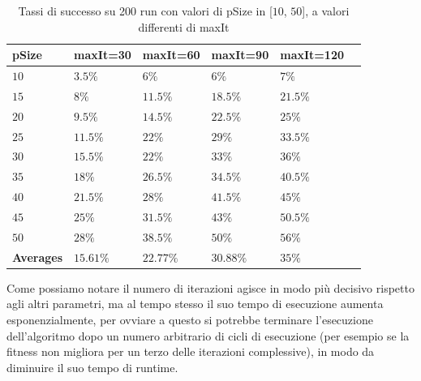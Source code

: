 \begin{center}
\begin{table}[H]
    \centering
    \begin{tabular}{|C{2.18cm}C{2.18cm}C{2.18cm}C{2.18cm}C{2.18cm}C{2.18cm}|}
        \hline
        \textbf{pSize} & \textbf{maxIt=30} & \textbf{maxIt=60} & \textbf{maxIt=90} & \textbf{maxIt=120} \\ \hline
        
         $10$ &  $3.5\%$ &  $6\%$ &  $6\%$ &  $7\%$ \\
            
        $15$ & $8\%$ & $11.5\%$ & $18.5\%$ & $21.5\%$ \\
            
         $20$ &  $9.5\%$ &  $14.5\%$ &  $22.5\%$ &  $25\%$ \\
            
        $25$ & $11.5\%$ & $22\%$ & $29\%$ & $33.5\%$ \\
            
         $30$ &  $15.5\%$ &  $22\%$ &  $33\%$ &  $36\%$ \\
            
        $35$ & $18\%$ & $26.5\%$ & $34.5\%$ & $40.5\%$ \\
            
         $40$ &  $21.5\%$ &  $28\%$ &  $41.5\%$ &  $45\%$ \\
            
        $45$ & $25\%$ & $31.5\%$ & $43\%$ & $50.5\%$ \\
            
         $50$ &  $28\%$ &  $38.5\%$ &  $50\%$ &  $56\%$ \\
            
        \hline
        
        \textbf{Averages} & $15.61\%$ & $22.77\%$ & $30.88\%$ & $35\%$ \\
        
        \hline
    \end{tabular}
    \caption{Tassi di successo su 200 run con valori di pSize in [$10$, $50$], a valori differenti di maxIt}
    \label{tab:table4}
\end{table}
\end{center}
Come possiamo notare il numero di iterazioni agisce in modo pi\`u decisivo rispetto agli altri parametri, ma al tempo stesso il suo tempo di esecuzione aumenta esponenzialmente, per ovviare a questo si potrebbe terminare l'esecuzione dell'algoritmo dopo un numero arbitrario di cicli di esecuzione (per esempio se la fitness non migliora per un terzo delle iterazioni complessive), in modo da diminuire il suo tempo di runtime.

